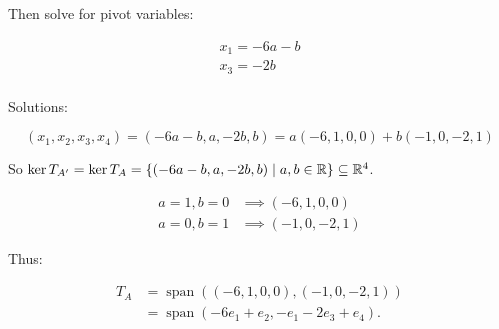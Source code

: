 {{		Then solve for pivot variables:

		\begin{align*}
			x_1 = -6a - b \\
			x_3 = -2b     \\
		\end{align*}

		Solutions:

		\[
			(x_1, x_2, x_3, x_4) = (-6a - b, a, -2b, b) = a(-6, 1, 0, 0) + b(-1, 0, -2, 1)
		\]

		So \(\ker T_{A'} = \ker T_{A} = \left\{ (-6a - b, a, -2b, b) \mid a, b \in \RR \right\} \subseteq \RR^{4}\).

		\begin{align*}
			a = 1, b = 0 & \implies (-6, 1, 0, 0)  \\
			a = 0, b = 1 & \implies (-1, 0, -2, 1)
		\end{align*}

		Thus:

		\begin{align*}
			T_{A} & = \operatorname{span}\left( (-6, 1, 0, 0), (-1, 0, -2, 1) \right)   \\
			      & = \operatorname{span}\left( -6e_1 + e_2, -e_1 - 2e_3 + e_4 \right).
		\end{align*}
	}
}

